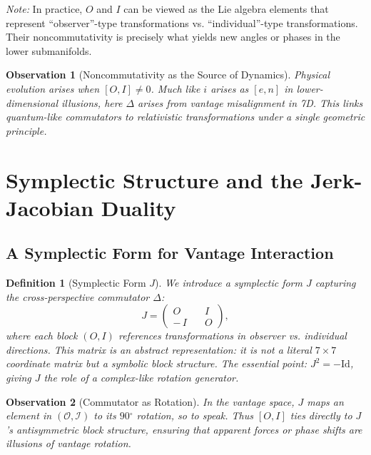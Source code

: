 \documentclass{article}
\newtheorem{definition}{Definition}
\newtheorem{observation}{Observation}
\begin{document}
\noindent
\textit{Note:} In practice, $O$ and $I$ can be viewed as the Lie algebra elements that represent ``observer''-type transformations vs.
``individual''-type transformations. Their noncommutativity is precisely what yields new angles or phases in the lower submanifolds.

\begin{observation}[Noncommutativity as the Source of Dynamics]
Physical evolution arises when $[O,I] \neq 0$. Much like $i$ arises as $[e,n]$ in lower-dimensional illusions, here $\Delta$ arises from vantage misalignment in 7D. This links quantum-like commutators to relativistic transformations under a single geometric principle.
\end{observation}

\section{Symplectic Structure and the Jerk-Jacobian Duality}

\subsection*{A Symplectic Form for Vantage Interaction}

\begin{definition}[Symplectic Form $J$]
We introduce a symplectic form $J$ capturing the cross-perspective commutator $\Delta$:
\begin{equation}
J = \begin{pmatrix}
O &\quad I \\
-\,I &\quad O
\end{pmatrix},
\end{equation}
where each block $(O,I)$ references transformations in observer vs.
individual directions. This matrix is an abstract representation: it is \emph{not} a literal $7\times7$ coordinate matrix but a symbolic block structure. The essential point: $J^2 = -\mathrm{Id}$, giving $J$ the role of a complex-like rotation generator.
\end{definition}

\begin{observation}[Commutator as Rotation]
In the vantage space, $J$ maps an element in $(\mathcal{O},\mathcal{I})$ to its $90\!^\circ$ rotation, so to speak. Thus $[O,I]$ ties directly to $J$'s antisymmetric block structure, ensuring that apparent forces or phase shifts are illusions of vantage rotation.
\end{observation}
\end{document}
